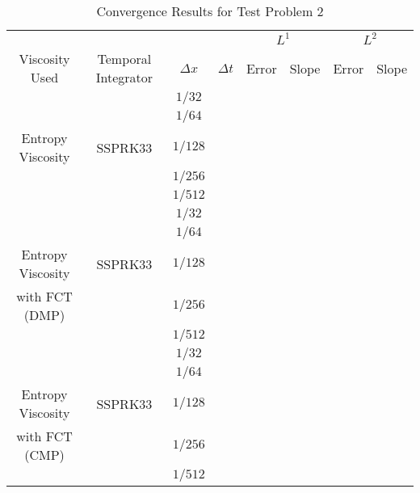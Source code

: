 \documentclass{report}
\begin{document}
\begin{table}[H]\caption{\label{prob2}Convergence Results for Test Problem 2}
\begin{center}
\begin{tabular}{c|c|c|c||c|c|c|c}\hline\hline
& & & & \multicolumn{2}{c}{$L^1$} & \multicolumn{2}{|c}{$L^2$}\\ \cline{5-8}
Viscosity Used         & Temporal Integrator & $\Delta x$ & $\Delta t$ & Error & Slope & Error & Slope \\ \hline\hline
                       &                     & $1/32$     &            &       &       &       &       \\
                       &                     & $1/64$     &            &       &       &       &       \\
Entropy Viscosity      & SSPRK33             & $1/128$    &            &       &       &       &       \\
                       &                     & $1/256$    &            &       &       &       &       \\
                       &                     & $1/512$    &            &       &       &       &       \\ \hline
                       &                     & $1/32$     &            &       &       &       &       \\
                       &                     & $1/64$     &            &       &       &       &       \\
Entropy Viscosity      & SSPRK33             & $1/128$    &            &       &       &       &       \\
with FCT (DMP)         &                     & $1/256$    &            &       &       &       &       \\
                       &                     & $1/512$    &            &       &       &       &       \\ \hline
                       &                     & $1/32$     &            &       &       &       &       \\
                       &                     & $1/64$     &            &       &       &       &       \\
Entropy Viscosity      & SSPRK33             & $1/128$    &            &       &       &       &       \\
with FCT (CMP)         &                     & $1/256$    &            &       &       &       &       \\
                       &                     & $1/512$    &            &       &       &       &       \\ \hline\hline
\end{tabular}
\end{center}
\end{table}
\end{document}
